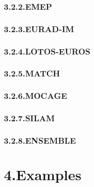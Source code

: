 \documentclass[9pt]{report}
\begin{document}
\subsubsection{3.2.2.\hspace*{0.5em}EMEP}\label{sec-emep}%

\subsubsection{3.2.3.\hspace*{0.5em}EURAD-IM}\label{sec-eurad-im}%

\subsubsection{3.2.4.\hspace*{0.5em}LOTOS-EUROS}\label{sec-lotos-euros}%

\subsubsection{3.2.5.\hspace*{0.5em}MATCH}\label{sec-match}%

\subsubsection{3.2.6.\hspace*{0.5em}MOCAGE}\label{sec-mocage}%

\subsubsection{3.2.7.\hspace*{0.5em}SILAM}\label{sec-silam}%

\subsubsection{3.2.8.\hspace*{0.5em}ENSEMBLE}\label{sec-ensemble}%

\section{4.\hspace*{0.5em}Examples}\label{sec-examples}%
\end{document}
